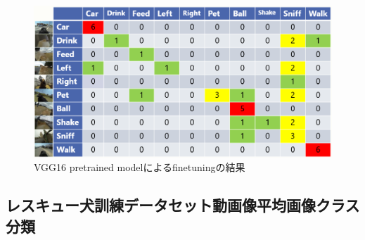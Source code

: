 \begin{figure}[htbp]
   \begin{center}

    \includegraphics[scale=0.3]{./Figures/vgg16_res.eps}
    \caption{VGG16 pretrained modelによるfinetuningの結果}
    \label{vgg16_res}
   \end{center}
\end{figure}



\subsection{レスキュー犬訓練データセット動画像平均画像クラス分類}

